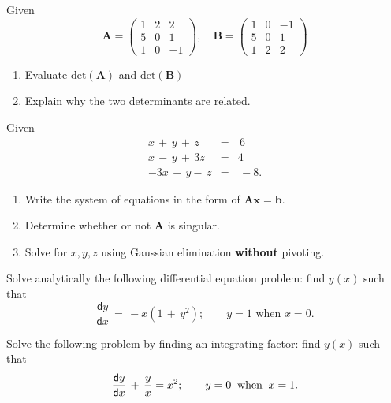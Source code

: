\documentclass[12pt]{article}
\def\bA{\mathbf{A}}
\def\bB{\mathbf{B}}
\newcommand{\dif}{\mathsf{d}}
\begin{document}
Given
\[ \bA=   \left ( \begin{array}{rrr} 1 & 2 & 2 \\ 5 & 0 & 1 \\ 1 & 0 & -1 \end{array} \right),\quad \bB=   \left ( \begin{array}{rrr} 1 & 0 & -1\\ 5 & 0 & 1 \\  1 & 2 & 2  \end{array} \right) \]
\begin{enumerate}
\item Evaluate $\mathrm{det}(\bA)$ and $\mathrm{det}(\bB)$
\item Explain why the two determinants are related.
\end{enumerate}




\newpage
\question
Given
\vspace{-0.5cm}
\begin{eqnarray*}
x\,+\,y\,+\,z&=&\,6\\
x\,-\,y\,+\,3z&=&4\\
-3x\,+ \,y -\,z&=&\,-8 .
\end{eqnarray*}
            \begin{enumerate}
            \item Write the system of  equations in the form of $\bA \mathbf{x}=\mathbf{b}$.
            \item Determine whether or not {\bf A} is singular.
            \item Solve for $x,y,z$ using Gaussian elimination {\bf without} pivoting.
    \end{enumerate}
	

\question
Solve analytically the following differential equation problem: find $y(x)$ such that
$$ \frac{\dif y}{\dif x}\,=\, -x(1\,+\,y^2)   ; \qquad y=1 \mbox{ when } x=0. $$
\noindent
 [Hint:   use the fact that
$\displaystyle \int {1 \over {a^2+x^2}} \, \dif x=  \frac{1}{a}\tan^{-1} {x \over a},\ a\ne 0$.]


\question
Solve the following problem by finding an  integrating factor:  find $y(x)$ such that
$$  \frac{\dif y}{\dif x}\,+\, \frac{y}{x} = x^2   ; \qquad y=0\>\hbox{ when }\> x=1. $$

\end{document}
